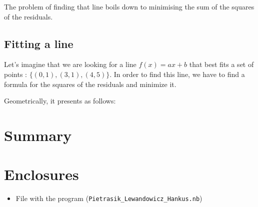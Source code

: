 \documentclass{MathematicaReport}
\begin{document}
The problem of finding that line boils down to minimising the sum of the 
squares of the residuals.

\subsection{Fitting a line}
Let's imagine that we are looking for a line \( f(x) = ax + b \) that best fits 
a set of points : \( \{(0,1), (3,1), (4,5)\} \). In order to find this line,
we have to find a formula for the squares of the residuals and minimize it.

Geometrically, it presents as follows:
\begin{center}
	
\end{center}


\section{Summary}

\section*{Enclosures} 
\begin{itemize}
	\item File with the program (\texttt{Pietrasik\_Lewandowicz\_Hankus.nb})
\end{itemize}
\end{document}
